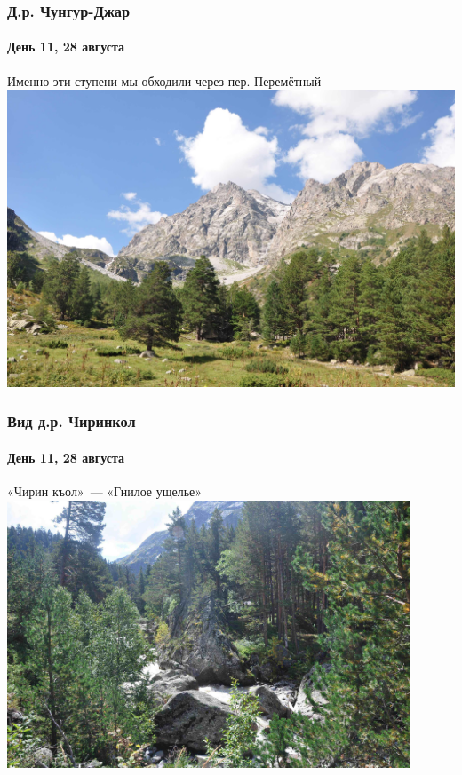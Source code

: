\begin{frame}
	\frametitle{Д.р. Чунгур-Джар}
	\framesubtitle{День 11, 28 августа}	
	\footnotesize Именно эти ступени мы обходили через пер. Перемётный
	\centering
	\includegraphics[width=\textwidth]{../pics/DSC_0459 2}			
\end{frame}

\begin{frame}
	\frametitle{Вид д.р. Чиринкол}
	\framesubtitle{День 11, 28 августа}	
	\footnotesize«Чирин къол»~--- «Гнилое ущелье»
	\centering
	\includegraphics[width=0.9\textwidth]{../pics/DSC_0461 2}			
\end{frame}

